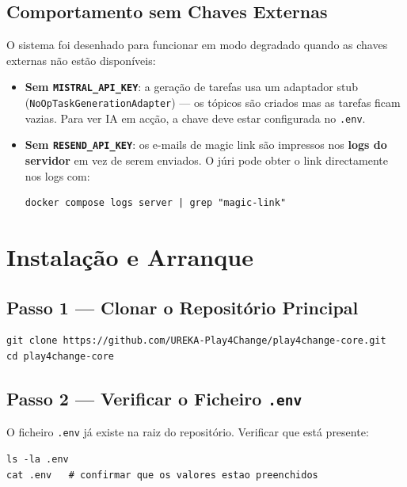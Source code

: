 \documentclass[12pt,a4paper]{article}
\newcommand{\file}[1]{\texttt{\small\color{darkgray}#1}}
\newcommand{\env}[1]{\texttt{\small\color{iselred}#1}}
\begin{document}
\subsection{Comportamento sem Chaves Externas}

O sistema foi desenhado para funcionar em modo degradado quando as chaves externas não estão disponíveis:

\begin{itemize}
  \item \textbf{Sem \env{MISTRAL\_API\_KEY}}: a geração de tarefas usa um adaptador stub (\texttt{NoOpTaskGenerationAdapter}) — os tópicos são criados mas as tarefas ficam vazias. Para ver IA em acção, a chave deve estar configurada no \file{.env}.

  \item \textbf{Sem \env{RESEND\_API\_KEY}}: os e-mails de magic link são impressos nos \textbf{logs do servidor} em vez de serem enviados. O júri pode obter o link directamente nos logs com:
  \begin{lstlisting}[style=bash]
  docker compose logs server | grep "magic-link"
  \end{lstlisting}

\end{itemize}

\section{Instalação e Arranque}

\subsection{Passo 1 — Clonar o Repositório Principal}

\begin{lstlisting}[style=bash]
git clone https://github.com/UREKA-Play4Change/play4change-core.git
cd play4change-core
\end{lstlisting}

\subsection{Passo 2 — Verificar o Ficheiro \texttt{.env}}

O ficheiro \file{.env} já existe na raiz do repositório. Verificar que está presente:

\begin{lstlisting}[style=bash]
ls -la .env
cat .env   # confirmar que os valores estao preenchidos
\end{lstlisting}
\end{document}
